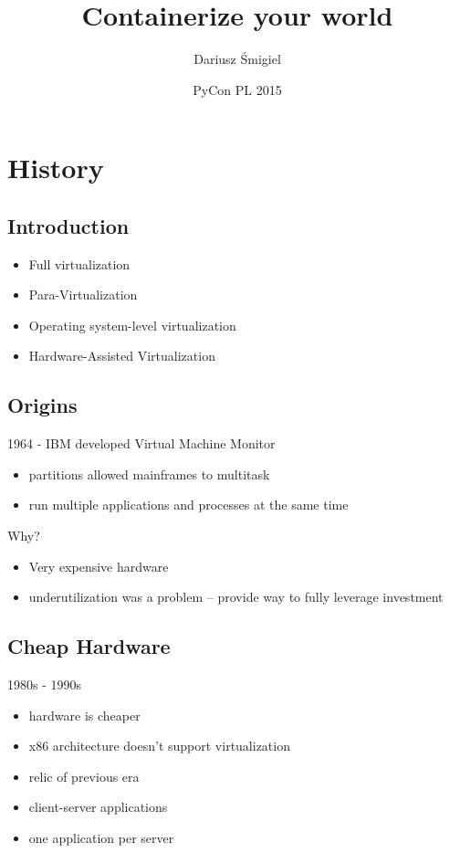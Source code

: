 \documentclass{beamer}
\title{Containerize your world}
\author{Dariusz Śmigiel}
\date{PyCon PL 2015}
\begin{document}
\begin{frame}
\titlepage
\end{frame}

\section{History}
\subsection{Introduction}
\begin{frame}
\begin{itemize}
\item Full virtualization
\item Para-Virtualization
\item Operating system-level virtualization
\item Hardware-Assisted Virtualization
\end{itemize}
\end{frame}

\subsection{Origins}
\begin{frame}
1964 - IBM developed Virtual Machine Monitor \\
\pause
\begin{itemize}
\item partitions allowed mainframes to multitask
\item run multiple applications and processes at the same time
\end{itemize}
\pause
Why? \\
\begin{itemize}
\item Very expensive hardware
\item underutilization was a problem -- provide way to fully leverage investment
\end{itemize}
\end{frame}

\subsection{Cheap Hardware}
\begin{frame}
1980s - 1990s \\
\begin{itemize}
\item hardware is cheaper
\pause
\item x86 architecture doesn't support virtualization
\pause
\item relic of previous era
\pause
\item client-server applications
\pause
\item one application per server
\end{itemize}
\end{frame}
\end{document}
